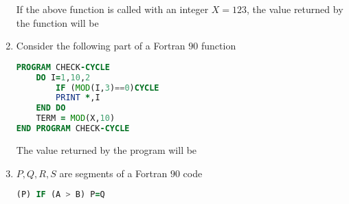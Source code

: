 \documentclass[journal]{IEEEtran}
\begin{document}
\begin{enumerate}
	If the above function is called with an integer $X=123$, the value returned by the function will be
	\begin{enumerate}
\end{enumerate}
\item Consider the following part of a Fortran $90$ function\\
\begin{lstlisting}[language=Fortran]
PROGRAM CHECK-CYCLE
    DO I=1,10,2
        IF (MOD(I,3)==0)CYCLE
        PRINT *,I
    END DO
    TERM = MOD(X,10)
END PROGRAM CHECK-CYCLE
\end{lstlisting}

	The value returned by the program will be
	\begin{enumerate}
\end{enumerate}
\item $P,Q,R,S$ are segments of a Fortran $90$ code
\begin{lstlisting}[language=Fortran]
(P) IF (A > B) P=Q


\end{lstlisting}
\end{enumerate}
\end{document}
